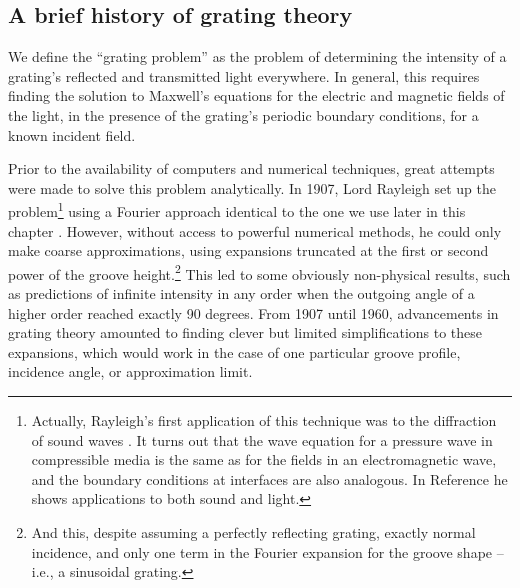 \subsection{A brief history of grating theory}

We define the ``grating problem'' as the problem of determining the intensity of a grating's reflected and transmitted light everywhere.  In general, this requires finding the solution to Maxwell's equations for the electric and magnetic fields of the light, in the presence of the grating's periodic boundary conditions, for a known incident field.  

Prior to the availability of computers and numerical techniques, great attempts were made to solve this problem analytically.  In 1907, Lord Rayleigh set up the problem\footnote{Actually, Rayleigh's first application of this technique was to the diffraction of sound waves \cite{Ray86}.  It turns out that the wave equation for a pressure wave in compressible media is the same as for the fields in an electromagnetic wave, and the boundary conditions at interfaces are also analogous. In Reference \cite{Ray07} he shows applications to both sound and light.} using a Fourier approach identical to the one we use later in this chapter \cite{Ray07}.  However, without access to powerful numerical methods, he could only make coarse approximations, using expansions truncated at the first or second power of the groove height.\footnote{And this, despite assuming a perfectly reflecting grating, exactly normal incidence, and only one term in the Fourier expansion for the groove shape -- i.e., a sinusoidal grating.}  This led to some obviously non-physical results, such as predictions of infinite intensity in any order when the outgoing angle of a higher order reached exactly 90 degrees.  From 1907 until 1960, advancements in grating theory amounted to finding clever but limited simplifications to these expansions, which would work in the case of one particular groove profile, incidence angle, or approximation limit.

